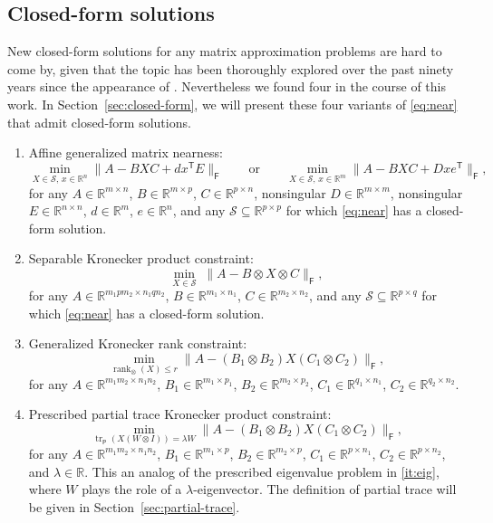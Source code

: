 \documentclass[11pt,reqno]{amsart}
\newcommand{\tp}{{\scriptscriptstyle\mathsf{T}}}
\newcommand{\F}{{\scriptscriptstyle\mathsf{F}}}
\newcommand{\Par}{{\scriptscriptstyle\mathsf{P}}}
\DeclareMathOperator{\rank}{rank}
\DeclareMathOperator{\tr}{tr}
\theoremstyle{definition}
\numberwithin{equation}{section}
\newcommand{\R}{\mathbb{R}}
\begin{document}
\subsection{Closed-form solutions}\label{sec:closed}

New closed-form solutions for any matrix approximation problems are hard to come by, given that the topic has been thoroughly explored over the past ninety years since the appearance of \cite{Eck}. Nevertheless we found four in the course of this work. In Section~\ref{sec:closed-form}, we will present these four variants of \eqref{eq:near} that admit closed-form solutions.
\begin{enumerate}[\normalfont(i)]
\item Affine generalized matrix nearness:\label{it:aff}
\[
\min_{X \in \mathcal{S},\, x\in \R^n} \lVert A- B X C + dx^\tp E \rVert_\F \qquad \text{or} \qquad  \min_{X \in \mathcal{S},\, x\in \R^m} \lVert A- B X C + D xe^\tp \rVert_\F,
\]
for any $A \in \R^{m \times n}$, $B \in \R^{m \times p}$, $C \in \R^{p \times n}$, nonsingular $D \in \R^{m \times m}$, nonsingular $E \in \R^{n \times n}$,  $d \in \R^m$, $e \in \R^n$, and any $\mathcal{S} \subseteq \R^{p \times p}$ for which \eqref{eq:near} has a closed-form solution.

\item Separable Kronecker product constraint:\label{it:sep}
\[
\min_{X \in \mathcal{S}} \; \lVert A- B \otimes X \otimes C \rVert_\F,
\]
for any $A \in \R^{m_1 p m_2 \times n_1 q n_2}$, $B \in \R^{m_1 \times n_1}$, $C \in \R^{m_2 \times  n_2}$, and any $\mathcal{S} \subseteq \R^{p \times q}$  for which \eqref{eq:near} has a closed-form solution.

\item Generalized Kronecker rank constraint:\label{it:kron}
\[
\min_{\rank_\otimes(X) \le r} \lVert  A- (B_1 \otimes B_2)X(C_1 \otimes C_2) \rVert_\F,
\]
for any $A \in \R^{m_1m_2 \times n_1n_2}$, $B_1 \in \R^{m_1 \times p_1}$, $B_2 \in \R^{m_2 \times p_2}$, $C_1 \in \R^{q_1 \times n_1}$, $C_2 \in \R^{q_2 \times n_2}$.

\item Prescribed partial trace Kronecker product constraint:\label{it:ptr}
\[
\min_{ \tr_\Par(X(W \otimes I)) = \lambda W } \lVert  A- (B_1 \otimes B_2)X(C_1 \otimes C_2)  \rVert_\F,
\]
for any $A \in \R^{m_1m_2\times n_1n_2}$, $B_1 \in \R^{m_1 \times p}$, $B_2 \in \R^{m_2 \times p}$, $C_1 \in \R^{p \times n_1}$, $C_2 \in \R^{p \times n_2}$, and $\lambda \in \R$. This an analog of the prescribed eigenvalue problem in \ref{it:eig}, where $W$ plays the role of a $\lambda$-eigenvector. The definition of partial trace will be given in Section~\ref{sec:partial-trace}.
\end{enumerate}
\end{document}
